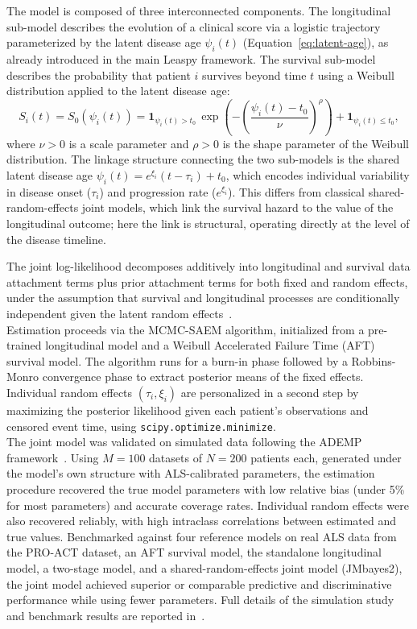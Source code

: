 \documentclass{rapportCS}
\begin{document}
The model is composed of three interconnected components. The longitudinal sub-model describes the evolution of a clinical score via a logistic trajectory parameterized by the latent disease age $\psi_i(t)$ (Equation~\eqref{eq:latent-age}), as already introduced in the main Leaspy framework. The survival sub-model describes the probability that patient $i$ survives beyond time $t$ using a Weibull distribution applied to the latent disease age:
\begin{equation}
  S_i(t) = S_0(\psi_i(t)) = \mathbf{1}_{\psi_i(t) > t_0}\, \exp\!\left(-\left(\frac{\psi_i(t) - t_0}{\nu}\right)^{\rho}\right) + \mathbf{1}_{\psi_i(t) \leq t_0},
\end{equation}
where $\nu > 0$ is a scale parameter and $\rho > 0$ is the shape parameter of the Weibull distribution. The linkage structure connecting the two sub-models is the shared latent disease age $\psi_i(t) = e^{\xi_i}(t - \tau_i) + t_0$, which encodes individual variability in disease onset ($\tau_i$) and progression rate ($e^{\xi_i}$). This differs from classical shared-random-effects joint models, which link the survival hazard to the value of the longitudinal outcome; here the link is structural, operating directly at the level of the disease timeline.

The joint log-likelihood decomposes additively into longitudinal and survival data attachment terms plus prior attachment terms for both fixed and random effects, under the assumption that survival and longitudinal processes are conditionally independent given the latent random effects~\cite{rizopoulos2012joint}. \\

\noindent Estimation proceeds via the MCMC-SAEM algorithm, initialized from a pre-trained longitudinal model and a Weibull Accelerated Failure Time (AFT) survival model. The algorithm runs for a burn-in phase followed by a Robbins-Monro convergence phase to extract posterior means of the fixed effects. Individual random effects $(\tau_i, \xi_i)$ are personalized in a second step by maximizing the posterior likelihood given each patient's observations and censored event time, using \texttt{scipy.optimize.minimize}. \\

\noindent The joint model was validated on simulated data following the ADEMP framework~\cite{morris2019using}. Using $M = 100$ datasets of $N = 200$ patients each, generated under the model's own structure with ALS-calibrated parameters, the estimation procedure recovered the true model parameters with low relative bias (under 5\% for most parameters) and accurate coverage rates. Individual random effects were also recovered reliably, with high intraclass correlations between estimated and true values. Benchmarked against four reference models on real ALS data from the PRO-ACT dataset, an AFT survival model, the standalone longitudinal model, a two-stage model, and a shared-random-effects joint model (JMbayes2), the joint model achieved superior or comparable predictive and discriminative performance while using fewer parameters. Full details of the simulation study and benchmark results are reported in~\cite{ortholand2025joint}.
\end{document}
